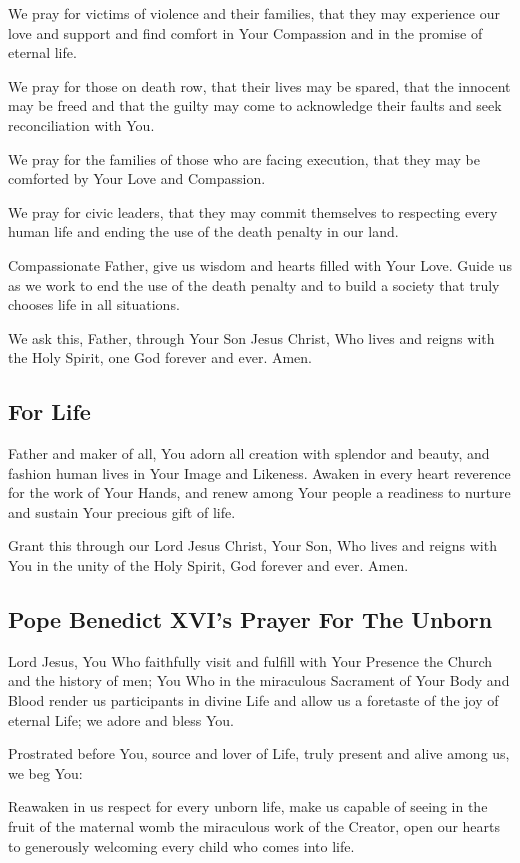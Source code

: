 \documentclass[12pt]{article}
\newcommand{\prayertitle}[1]{\subsection{#1}}
\begin{document}
We pray for victims of violence and their families, that they may experience our love and support and find comfort in Your Compassion and in the promise of eternal life.

We pray for those on death row, that their lives may be spared, that the innocent may be freed and that the guilty may come to acknowledge their faults and seek reconciliation with You.

We pray for the families of those who are facing execution, that they may be comforted by Your Love and Compassion.

We pray for civic leaders, that they may commit themselves to respecting every human life and ending the use of the death penalty in our land.

Compassionate Father, give us wisdom and hearts filled with Your Love.
Guide us as we work to end the use of the death penalty and to build a society that truly chooses life in all situations.

We ask this, Father, through Your Son Jesus Christ, Who lives and reigns with the Holy Spirit, one God forever and ever.
Amen.

\prayertitle{For Life}
Father and maker of all, You adorn all creation with splendor and beauty, and fashion human lives in Your Image and Likeness.
Awaken in every heart reverence for the work of Your Hands, and renew among Your people
a readiness to nurture and sustain Your precious gift of life.

Grant this through our Lord Jesus Christ, Your Son, Who lives and reigns with You in 
the unity of the Holy Spirit, God forever and ever.
Amen.

\prayertitle{Pope Benedict XVI's Prayer For The Unborn}
\label{prayer:benedict_xvi_unborn}
Lord Jesus, 
You Who faithfully visit and fulfill with Your Presence the Church and the history of men;
You Who in the miraculous Sacrament of Your Body and Blood render us participants in divine Life and allow us a foretaste of the joy of eternal Life;
we adore and bless You.

Prostrated before You, source and lover of Life, truly present and alive among us, we beg You:

Reawaken in us respect for every unborn life, make us capable of seeing in the fruit of the maternal womb the miraculous work of the Creator, open our hearts to generously welcoming every child who comes into life.
\end{document}
